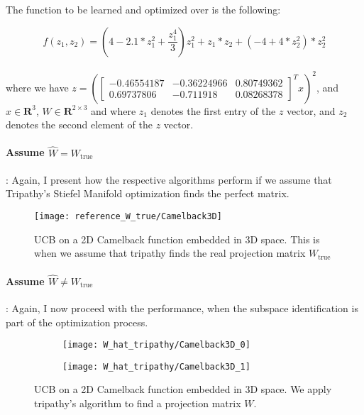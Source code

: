The function to be learned and optimized over is the following:

\def\WCamelback3D{
\begin{bmatrix}
    -0.46554187 & -0.36224966 & 0.80749362 \\
     0.69737806 & -0.711918 & 0.08268378
\end{bmatrix}}

\begin{equation}
f(z_1, z_2) = \left( 4 - 2.1 * z_1^2 + \frac{z_1^4}{3} \right)  z_1^2 + z_1 *  z_2 + \left(-4 + 4 * z_2^2 \right) * z_2^2
\end{equation} \\

where we have $z = \left( \WCamelback3D^T x \right)^2 $, and $ x \in \mathbf{R}^3$, $W \in \mathbf{R}^{2 \times 3}$ and where $z_1$ denotes the first entry of the $z$ vector, and $z_2$ denotes the second element of the $z$ vector.

\paragraph{Assume $\hat{W} = W_{\text{true}}$}: Again, I present how the respective algorithms perform if we assume that Tripathy's Stiefel Manifold optimization finds the perfect matrix.

\begin{figure}[H]
  \centering
      \texttt{[image: reference\_W\_true/Camelback3D]}
  \caption{UCB on a 2D Camelback function embedded in 3D space.
  This is when we assume that tripathy finds the real projection matrix $W_{\text{true}}$}
\end{figure}

\paragraph{Assume $\hat{W} \neq W_{\text{true}}$}: Again, I now proceed with the performance, when the subspace identification is part of the optimization process.

\begin{figure}[H]
    \centering
    \begin{subfigure}[b]{0.40\textwidth}
        \texttt{[image: W\_hat\_tripathy/Camelback3D\_0]}
        \label{fig:gull}
    \end{subfigure}
    \begin{subfigure}[b]{0.40\textwidth}
        \texttt{[image: W\_hat\_tripathy/Camelback3D\_1]}
        \label{fig:tiger}
    \end{subfigure}   
        \caption{UCB on a 2D Camelback function embedded in 3D space.
  		We apply tripathy's algorithm to find a projection matrix $W$.}
\end{figure}


